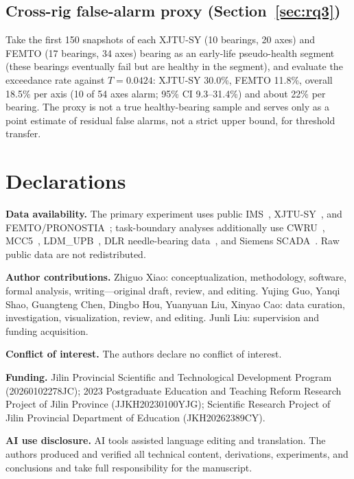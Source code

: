 \documentclass[journal]{IEEEtran}
\begin{document}
\subsection*{Cross-rig false-alarm proxy (Section~\ref{sec:rq3})}
Take the first 150 snapshots of each XJTU-SY (10 bearings, 20 axes) and FEMTO (17 bearings, 34 axes) bearing as an early-life pseudo-health segment (these bearings eventually fail but are healthy in the segment), and evaluate the exceedance rate against $T=0.0424$: XJTU-SY 30.0\%, FEMTO 11.8\%, overall 18.5\% per axis (10 of 54 axes alarm; 95\% CI 9.3--31.4\%) and about 22\% per bearing. The proxy is not a true healthy-bearing sample and serves only as a point estimate of residual false alarms, not a strict upper bound, for threshold transfer.

\section*{Declarations}
\textbf{Data availability.} The primary experiment uses public IMS~\cite{lee2007}, XJTU-SY~\cite{wang2020}, and FEMTO/PRONOSTIA~\cite{nectoux2012}; task-boundary analyses additionally use CWRU~\cite{smith2015}, MCC5~\cite{mcc5dataset}, LDM\_UPB~\cite{javanmardi2024,aimiyekagbon2024}, DLR needle-bearing data~\cite{seferli2026}, and Siemens SCADA~\cite{siemens2026}. Raw public data are not redistributed.

\textbf{Author contributions.} Zhiguo Xiao: conceptualization, methodology, software, formal analysis, writing---original draft, review, and editing. Yujing Guo, Yanqi Shao, Guangteng Chen, Dingbo Hou, Yuanyuan Liu, Xinyao Cao: data curation, investigation, visualization, review, and editing. Junli Liu: supervision and funding acquisition.

\textbf{Conflict of interest.} The authors declare no conflict of interest.

\textbf{Funding.} Jilin Provincial Scientific and Technological Development Program (20260102278JC); 2023 Postgraduate Education and Teaching Reform Research Project of Jilin Province (JJKH20230100YJG); Scientific Research Project of Jilin Provincial Department of Education (JKH20262389CY).

\textbf{AI use disclosure.} AI tools assisted language editing and translation. The authors produced and verified all technical content, derivations, experiments, and conclusions and take full responsibility for the manuscript.



\end{document}

